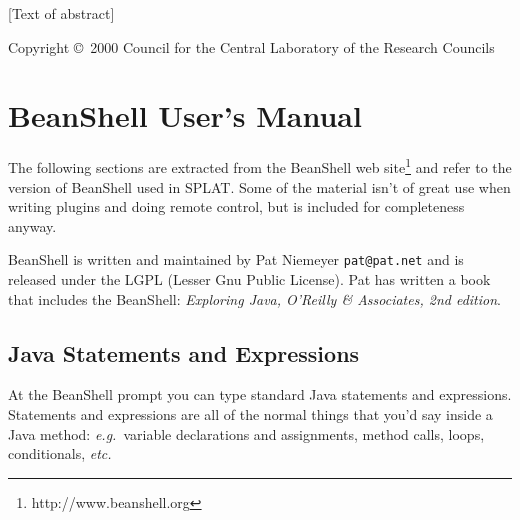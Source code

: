 \documentclass[twoside,11pt]{article}
\newcommand{\stardocinitials}  {SUN}
\newcommand{\stardoccopyright} 
{Copyright \copyright\ 2000 Council for the Central Laboratory of the Research Councils}
\newcommand{\stardocnumber}    {[number].[version]}
\newcommand{\stardocabstract}  {[Text of abstract]}
\newcommand{\stardocname}{\stardocinitials /\stardocnumber}
\newcommand{\htmladdnormallinkfoot}[2]{#1\footnote{#2}}
\newcommand{\htmladdnormallink}[2]{#1}
\newenvironment{latexonly}{}{}
\renewcommand{\_}{\texttt{\symbol{95}}}
\newcommand{\SPLAT}{\textsf{SPLAT}}
\newcommand{\eg}{\textit{e.g.}}
\newcommand{\etc}{\textit{etc.}}
\renewcommand{\thepage}{\roman{page}}
\begin{document}
\stardocabstract

\begin{latexonly}
\newpage
\vspace*{\fill}
\stardoccopyright
\end{latexonly}

  \newpage
  \begin{latexonly}
    \setlength{\parskip}{0mm}
    \tableofcontents
    \setlength{\parskip}{\medskipamount}
    \markboth{\stardocname}{\stardocname}
  \end{latexonly}

\cleardoublepage
\renewcommand{\thepage}{\arabic{page}}
\setcounter{page}{1}

\section{BeanShell User's Manual}

The following sections are extracted from the BeanShell 
\htmladdnormallinkfoot{web site}{http://www.beanshell.org} and
refer to the version of BeanShell used in \SPLAT. Some of the material
isn't of great use when writing plugins and doing remote control, but
is included for completeness anyway.

BeanShell is written and maintained by Pat Niemeyer 
\htmladdnormallink{\texttt{pat@pat.net}}{mailto:pat@pat.net} and is
released under the LGPL (Lesser Gnu Public License). Pat has written a
book that includes the BeanShell: \textit{Exploring Java, O'Reilly \&
Associates, 2nd edition}.


\subsection{Java Statements and Expressions}

At the BeanShell prompt you can type standard Java statements and
expressions.  Statements and expressions are all of the normal things
that you'd say inside a Java method: \eg\ variable declarations and
assignments, method calls, loops, conditionals, \etc
\end{document}
